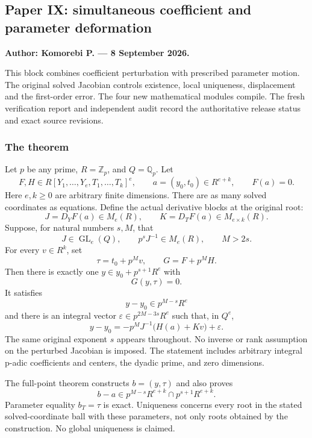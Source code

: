 \hypertarget{cont10:paper-ix-simultaneous-coefficient-and-parameter-deformation}{%
\subsection{Paper IX: simultaneous coefficient and parameter
deformation}\label{cont10:paper-ix-simultaneous-coefficient-and-parameter-deformation}}

\textbf{Author: Komorebi P. --- 8 September 2026.}

This block combines coefficient perturbation with prescribed parameter
motion. The original solved Jacobian controls existence, local
uniqueness, displacement and the first-order error. The four new
mathematical modules compile. The fresh verification report and
independent audit record the authoritative release status and exact
source revisions.

\hypertarget{cont10:the-theorem}{%
\subsubsection{The theorem}\label{cont10:the-theorem}}

Let \(p\) be any prime, \(R=\mathbb Z_p\), and \(Q=\mathbb Q_p\). Let \[
F,H\in R[Y_1,\ldots,Y_e,T_1,\ldots,T_k]^e,
\qquad a=(y_0,t_0)\in R^{e+k},\qquad F(a)=0.
\] Here \(e,k\ge0\) are arbitrary finite dimensions. There are as many
solved coordinates as equations. Define the actual derivative blocks at
the original root: \[
J=D_YF(a)\in M_e(R),\qquad K=D_TF(a)\in M_{e\times k}(R).
\] Suppose, for natural numbers \(s,M\), that \[
J\in\operatorname{GL}_e(Q),\qquad p^sJ^{-1}\in M_e(R),\qquad M>2s.
\] For every \(v\in R^k\), set \[
\tau=t_0+p^Mv,\qquad G=F+p^MH.
\] Then there is exactly one \(y\in y_0+p^{s+1}R^e\) with \[
G(y,\tau)=0.
\] It satisfies \[
y-y_0\in p^{M-s}R^e
\] and there is an integral vector \(\varepsilon\in p^{2M-3s}R^e\) such
that, in \(Q^e\), \[
\boxed{\displaystyle
 y-y_0=-p^MJ^{-1}\bigl(H(a)+Kv\bigr)+\varepsilon.
}
\] The same original exponent \(s\) appears throughout. No inverse or
rank assumption on the perturbed Jacobian is imposed. The statement
includes arbitrary integral p-adic coefficients and centers, the dyadic
prime, and zero dimensions.

The full-point theorem constructs \(b=(y,\tau)\) and also proves \[
b-a\in p^{M-s}R^{e+k}\cap p^{s+1}R^{e+k}.
\] Parameter equality \(b_T=\tau\) is exact. Uniqueness concerns every
root in the stated solved-coordinate ball with these parameters, not
only roots obtained by the construction. No global uniqueness is
claimed.

